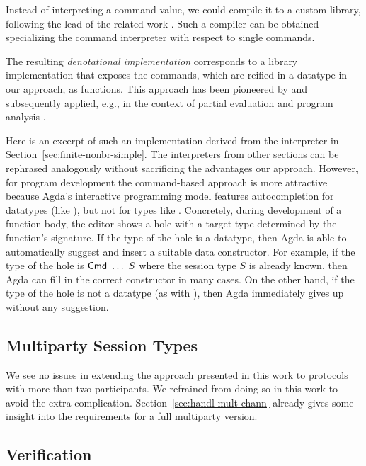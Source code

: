 \documentclass[acmsmall,screen]{acmart}
\begin{document}
Instead of interpreting a command value, we could compile it to a
custom library, following the lead of the related work
\cite{DBLP:journals/pacmpl/00020HNY20,DBLP:conf/cc/Miu0Y021}.
Such a compiler can be obtained specializing the command interpreter
with respect to single commands.

The resulting \emph{denotational implementation} corresponds to a library implementation that exposes
the commands, which are reified in a datatype in our approach, as
functions. This approach has been pioneered by \citet{Reynolds1994} and
subsequently applied, e.g., in the context of partial evaluation and
program analysis
\cite{DBLP:journals/jfp/Thiemann99,DBLP:journals/jfp/CaretteKS09}.

Here is an excerpt of such an implementation derived from the
interpreter in Section~\ref{sec:finite-nonbr-simple}.
\stCombinators
The interpreters from other sections can be rephrased analogously
without sacrificing the advantages our approach. However, for program
development the command-based approach is more attractive because 
Agda's interactive programming model features autocompletion for
datatypes (like {\ACommand}), but not for types like {\AXCommand}.
Concretely, during development of a function body, the editor shows a
hole with a target type determined by the function's signature. If the
type of the hole is a datatype, then Agda is able to automatically
suggest and insert a suitable data constructor. For example, if the
type of the hole is {$\ACommand\ \dots\ S$} where the session type $S$
is already known, then Agda can fill in the correct constructor in
many cases. On the other hand, if the type of the hole is not a
datatype (as with {\AXCommand}), then Agda
immediately gives up without any suggestion. 

\subsection{Multiparty Session Types}
\label{sec:mult-sess-types}

We see no issues in extending the approach presented in this work to
protocols with more than two participants. We refrained from doing so
in this work to avoid the extra
complication. Section~\ref{sec:handl-mult-chann} already gives some
insight into the requirements for a full multiparty version.

\subsection{Verification}
\label{sec:verification}
\end{document}
